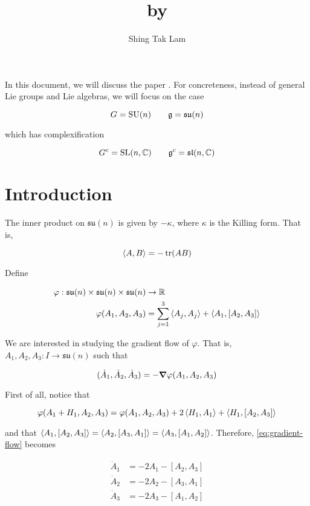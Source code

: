 \documentclass{article}
\title{\citetitle{kronheimer_instantons_1990} by \Citeauthor{kronheimer_instantons_1990}}
\author{Shing Tak Lam}
\DeclareMathOperator{\SU}{SU}
\newcommand{\su}{\mathfrak{su}}
\renewcommand{\sl}{\mathfrak{sl}}
\begin{document}
\maketitle

In this document, we will discuss the paper \cite{kronheimer_instantons_1990}. For concreteness, instead of general Lie groups and Lie algebras, we will focus on the case

\[G = \SU(n) \qquad \mfg = \su(n)\]

which has complexification

\[G^c = \SL(n, \C) \qquad \mfg^c = \sl(n, \C)\]

\tableofcontents

\section{Introduction}

The inner product on \(\su(n)\) is given by \(-\kappa\), where \(\kappa\) is the Killing form. That is,

\[\left\langle A, B \right\rangle = -\tr(AB)\]

Define

\begin{align*}
    \varphi : \su(n) \times \su(n) \times \su(n) &\to \R \\
    \varphi(A_1, A_2, A_3) &= \sum_{j=1}^3 \inner{A_j, A_j} + \inner{A_1, [A_2, A_3]}
\end{align*}

We are interested in studying the gradient flow of \(\varphi\). That is, \(A_1, A_2, A_3 : I \to \su(n)\) such that

\begin{equation}
    \label{eq:gradient-flow}
    (\dot A_1, \dot A_2, \dot A_3) = -\grad \varphi(A_1, A_2, A_3)
\end{equation}

First of all, notice that

\[\varphi(A_1 + H_1, A_2, A_3) = \varphi(A_1, A_2, A_3) + 2\left\langle H_1, A_1 \right\rangle + \left\langle H_1, [A_2, A_3] \right\rangle\]

and that \(\left\langle A_1, [A_2, A_3] \right\rangle = \left\langle A_2, [A_3, A_1] \right\rangle = \left\langle A_3, [A_1, A_2] \right\rangle\). Therefore, \cref{eq:gradient-flow} becomes

\begin{equation}
    \label{eq:gradient-flow-system}
    \begin{split}
        \dot A_1 &= -2A_1 - [A_2, A_3] \\
        \dot A_2 &= -2A_2 - [A_3, A_1] \\
        \dot A_3 &= -2A_3 - [A_1, A_2]
    \end{split}
\end{equation}
\end{document}
